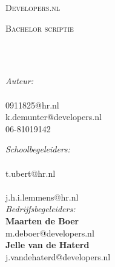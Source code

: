 \documentclass[
11pt, %
english, %
singlespacing, %
headsepline, %
]{formatting} %
\begin{document}

\begin{titlepage}
	\begin{center}
		{\scshape\LARGE Developers.nl\par}\vspace{0.5cm}
		{\scshape\LARGE \univname\par}\vspace{1.5cm} %
		\textsc{\Large Bachelor scriptie}\\[0.5cm] %
		
		\HRule \\[0.4cm] %
		{\huge \bfseries \ttitle\par}\vspace{0.4cm} %
		\HRule \\[1.5cm] %
		
		\begin{minipage}[t]{0.4\textwidth}
			\begin{flushleft} \large
				\emph{Auteur:}\\\textbf{\authorname}\\
				0911825@hr.nl\\
				k.demunter@developers.nl\\
				06-81019142\\
			\end{flushleft}
		\end{minipage}
		\begin{minipage}[t]{0.4\textwidth}
			\begin{flushright} \large
				\emph{Schoolbegeleiders:}\\
				\textbf{\techsupname}\\
				t.ubert@hr.nl\\
				\textbf{\skillssupname}\\
				j.h.i.lemmens@hr.nl\\[0.3cm]
				
				\emph{Bedrijfsbegeleiders:}\\
				\textbf{Maarten de Boer}\\
				m.deboer@developers.nl\\
				\textbf{Jelle van de Haterd}\\
				j.vandehaterd@developers.nl
			\end{flushright}
		\end{minipage}\\[2cm]
		

\end{center}
\end{titlepage}
\end{document}
